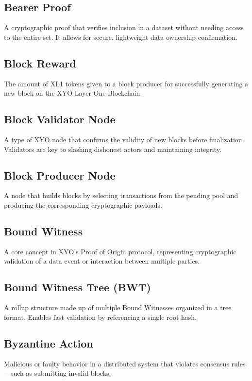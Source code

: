 \documentclass{article}
\begin{document}
\subsection*{Bearer Proof}
A cryptographic proof that verifies inclusion in a dataset without needing access to the entire set. It allows for secure, lightweight data ownership confirmation.

\subsection*{Block Reward}
The amount of XL1 tokens given to a block producer for successfully generating a new block on the XYO Layer One Blockchain.

\subsection*{Block Validator Node}
A type of XYO node that confirms the validity of new blocks before finalization. Validators are key to slashing dishonest actors and maintaining integrity.

\subsection*{Block Producer Node}
A node that builds blocks by selecting transactions from the pending pool and producing the corresponding cryptographic payloads.

\subsection*{Bound Witness}
A core concept in XYO's Proof of Origin protocol, representing cryptographic validation of a data event or interaction between multiple parties.

\subsection*{Bound Witness Tree (BWT)}
A rollup structure made up of multiple Bound Witnesses organized in a tree format. Enables fast validation by referencing a single root hash.

\subsection*{Byzantine Action}
Malicious or faulty behavior in a distributed system that violates consensus rules—such as submitting invalid blocks.
\end{document}
